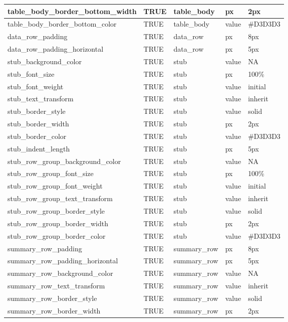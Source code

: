 \documentclass[
  letterpaper,
  DIV=11,
  numbers=noendperiod]{scrartcl}
\begin{document}
\begin{table}
{\begin{tabular}[t]{l|l|l|l|l}
\hline
table\_body\_border\_bottom\_width & TRUE & table\_body & px & 2px\\
\hline
table\_body\_border\_bottom\_color & TRUE & table\_body & value & \#D3D3D3\\
\hline
data\_row\_padding & TRUE & data\_row & px & 8px\\
\hline
data\_row\_padding\_horizontal & TRUE & data\_row & px & 5px\\
\hline
stub\_background\_color & TRUE & stub & value & NA\\
\hline
stub\_font\_size & TRUE & stub & px & 100\%\\
\hline
stub\_font\_weight & TRUE & stub & value & initial\\
\hline
stub\_text\_transform & TRUE & stub & value & inherit\\
\hline
stub\_border\_style & TRUE & stub & value & solid\\
\hline
stub\_border\_width & TRUE & stub & px & 2px\\
\hline
stub\_border\_color & TRUE & stub & value & \#D3D3D3\\
\hline
stub\_indent\_length & TRUE & stub & px & 5px\\
\hline
stub\_row\_group\_background\_color & TRUE & stub & value & NA\\
\hline
stub\_row\_group\_font\_size & TRUE & stub & px & 100\%\\
\hline
stub\_row\_group\_font\_weight & TRUE & stub & value & initial\\
\hline
stub\_row\_group\_text\_transform & TRUE & stub & value & inherit\\
\hline
stub\_row\_group\_border\_style & TRUE & stub & value & solid\\
\hline
stub\_row\_group\_border\_width & TRUE & stub & px & 2px\\
\hline
stub\_row\_group\_border\_color & TRUE & stub & value & \#D3D3D3\\
\hline
summary\_row\_padding & TRUE & summary\_row & px & 8px\\
\hline
summary\_row\_padding\_horizontal & TRUE & summary\_row & px & 5px\\
\hline
summary\_row\_background\_color & TRUE & summary\_row & value & NA\\
\hline
summary\_row\_text\_transform & TRUE & summary\_row & value & inherit\\
\hline
summary\_row\_border\_style & TRUE & summary\_row & value & solid\\
\hline
summary\_row\_border\_width & TRUE & summary\_row & px & 2px\\

\end{tabular}}
\end{table}
\end{document}
